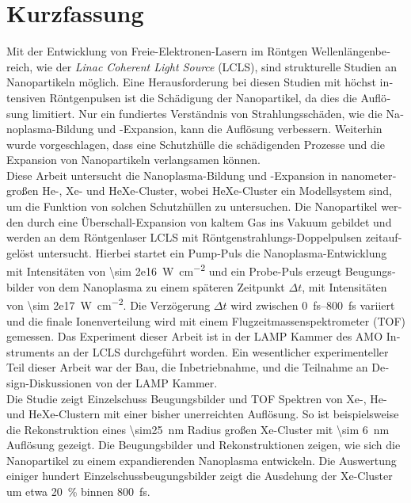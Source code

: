 \section*{Kurzfassung}
\begin{otherlanguage}{german}
Mit der Entwicklung von Freie-Elektronen-Lasern im Röntgen Wellenlängenbereich, wie der \textit{Linac Coherent Light Source} (LCLS), sind strukturelle Studien an Nanopartikeln möglich. Eine Herausforderung bei diesen Studien mit höchst intensiven Röntgenpulsen ist die Schädigung der Nanopartikel, da dies die Auflösung limitiert. Nur ein fundiertes Verständnis von Strahlungsschäden, wie die Nanoplasma-Bildung und -Expansion, kann die Auflösung verbessern. Weiterhin wurde vorgeschlagen, dass eine Schutzhülle die schädigenden Prozesse und die Expansion von Nanopartikeln verlangsamen können.\\[0.6\baselineskip]
%
Diese Arbeit untersucht die Nanoplasma-Bildung und -Expansion in nanometergroßen He-, Xe- und HeXe-Cluster, wobei HeXe-Cluster ein Modellsystem sind, um die Funktion von solchen Schutzhüllen zu untersuchen. Die Nanopartikel werden durch eine Überschall-Expansion von kaltem Gas ins Vakuum gebildet und werden an dem Röntgenlaser LCLS mit Röntgenstrahlungs-Doppelpulsen zeitaufgelöst untersucht. Hierbei startet ein Pump-Puls die Nanoplasma-Entwicklung mit Intensitäten von \SI{\sim 2e16}{\watt\per\square\centi\meter} und ein Probe-Puls erzeugt Beugungsbilder von dem Nanoplasma zu einem späteren Zeitpunkt $\Delta t$, mit Intensitäten von \SI{\sim 2e17}{\watt\per\square\centi\meter}. Die Verzögerung $\Delta t$ wird zwischen \SIrange{0}{800}{\femto\second} variiert und die finale Ionenverteilung wird mit einem Flugzeitmassenspektrometer (TOF) gemessen. Das Experiment dieser Arbeit ist in der LAMP Kammer des AMO Instruments an der LCLS durchgeführt worden. Ein wesentlicher experimenteller Teil dieser Arbeit war der Bau, die Inbetriebnahme, und die Teilnahme an Design-Diskussionen von der LAMP Kammer.\\[0.6\baselineskip]
%
Die Studie zeigt Einzelschuss Beugungsbilder und TOF Spektren von Xe-, He- und HeXe-Clustern mit einer bisher unerreichten Auflösung. So ist beispielsweise die Rekonstruktion eines \SI{\sim25}{\nano\meter} Radius großen Xe-Cluster mit \SI{\sim 6}{\nano\meter} Auflösung gezeigt. Die Beugungsbilder und Rekonstruktionen zeigen, wie sich die Nanopartikel zu einem expandierenden Nanoplasma entwickeln. Die Auswertung einiger hundert Einzelschussbeugungsbilder zeigt die Ausdehung der Xe-Cluster um etwa \SI{20}{\percent} binnen \SI{800}{\femto\second}. 

\end{otherlanguage}
